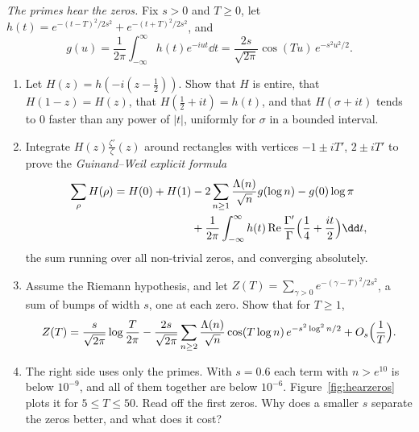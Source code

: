 \begin{exercise}[$\star\star\star$]\label{pb:hearzeros}
\emph{The primes hear the zeros.} Fix $s>0$ and $T\ge0$, let $h(t)=e^{-(t-T)^2/2s^2}+e^{-(t+T)^2/2s^2}$, and
\[
g(u)=\frac1{2\pi}\int_{-\infty}^\infty h(t)e^{-iut}\dd t=\frac{2s}{\sqrt{2\pi}}\cos(Tu)\,e^{-s^2u^2/2}.
\]
\begin{enumerate}[label=(\alph*)]
\item Let $H(z)=h(-i(z-\frac12))$. Show that $H$ is entire, that $H(1-z)=H(z)$, that $H(\frac12+it)=h(t)$, and that $H(\sigma+it)$ tends to $0$ faster than any
power of $|t|$, uniformly for $\sigma$ in a bounded interval.
\item Integrate $H(z)\frac{\zeta'}\zeta(z)$ around rectangles with vertices $-1\pm iT'$, $2\pm iT'$ to prove the \emph{Guinand--Weil explicit formula}
\[
\begin{aligned}\sum_\rho H(\rho)=H(0)+H(1)&-2\sum_{n\ge1}\frac{\Lambda(n)}{\sqrt n}g(\log n)-g(0)\log\pi\\&+\frac1{2\pi}\int_{-\infty}^\infty h(t)\operatorname{Re}\frac{\Gamma'}\Gamma\Bigl(\frac14+\frac{it}2\Bigr)\dd t,\end{aligned}
\]
the sum running over all non-trivial zeros, and converging absolutely.
\item Assume the Riemann hypothesis, and let $Z(T)=\sum_{\gamma>0}e^{-(\gamma-T)^2/2s^2}$, a sum of bumps of width $s$, one at each zero. Show that for $T\ge1$,
\[
Z(T)=\frac s{\sqrt{2\pi}}\log\frac T{2\pi}-\frac{2s}{\sqrt{2\pi}}\sum_{n\ge2}\frac{\Lambda(n)}{\sqrt n}\cos(T\log n)\,e^{-s^2\log^2n/2}+O_s\Bigl(\frac1T\Bigr).
\]
\item The right side uses only the primes. With $s=0.6$ each term with $n>e^{10}$ is below $10^{-9}$, and all of them together are below $10^{-6}$. Figure~\ref{fig:hearzeros} plots it for $5\le T\le50$. Read off
the first zeros. Why does a smaller $s$ separate the zeros better, and what does it cost?
\end{enumerate}
\end{exercise}

